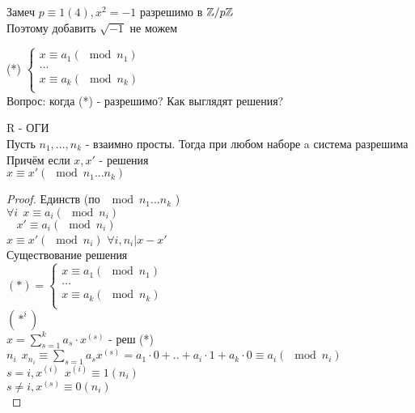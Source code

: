 Замеч $ p \equiv 1 (4), x^2 = -1 $ разрешимо в $ \mathbb{Z} / p\mathbb{Z} $ \\
Поэтому добавить $ \sqrt{-1} $ не можем \\


(*) $ \left\{\begin{array}{cc}
x \equiv a_1 (\mod n_1) \\
... \\
x \equiv a_k (\mod n_k) \\
\end{array}  \right. $ \\
Вопрос: когда (*) - разрешимо? Как выглядят решения? \\
\begin{theorem}
	R - ОГИ \\
	Пусть $ n_1, ..., n_k $ - взаимно просты. Тогда при любом наборе a система разрешима \\
	Причём если $ x, x' $ - решения \\
	$ x \equiv x'(\mod n_1...n_k) $ 
	\begin{proof}
		Единств (по $\mod n_1...n_k$ ) \\
		$ \forall i \ \ x \equiv a_i (\mod n_i) $ \\
		$ \ \ \ \ x' \equiv a_i (\mod n_i) $ \\
		$ x \equiv x' (\mod n_i) $ 
		$ \forall i, n_i | x - x' $ \\
		Существование решения \\
		$(*) =  \left\{\begin{array}{cc}
		x \equiv a_1 (\mod n_1) \\
		... \\
		x \equiv a_k (\mod n_k) \\
		\end{array}  \right. $ \\
		$(*^i) $ \\
		$ x = \sum_{s = 1}^{k} a_s \cdot x^{(s)} $ - реш (*) \\
		$ n_i \ \ x_{n_i} \equiv \sum_{s = 1}a_s x^{(s)} = a_1 \cdot 0 + .. + a_i \cdot 1 + a_k \cdot 0 \equiv a_i (\mod n_i)$ \\
		$ s = i, x^{(i)}  \ \ x^{(i)} \equiv 1 (n_i) $ \\
		$ s \neq i, x^{(s)} \equiv 0(n_i) $ \\
 	\end{proof}
\end{theorem}


